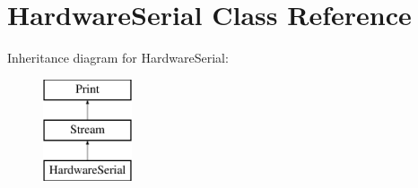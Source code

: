 \hypertarget{class_hardware_serial}{\section{Hardware\-Serial Class Reference}
\label{class_hardware_serial}
}
Inheritance diagram for Hardware\-Serial\-:\begin{figure}[H]
\begin{center}
\leavevmode
\includegraphics[height=3.000000cm]{class_hardware_serial}
\end{center}
\end{figure}
